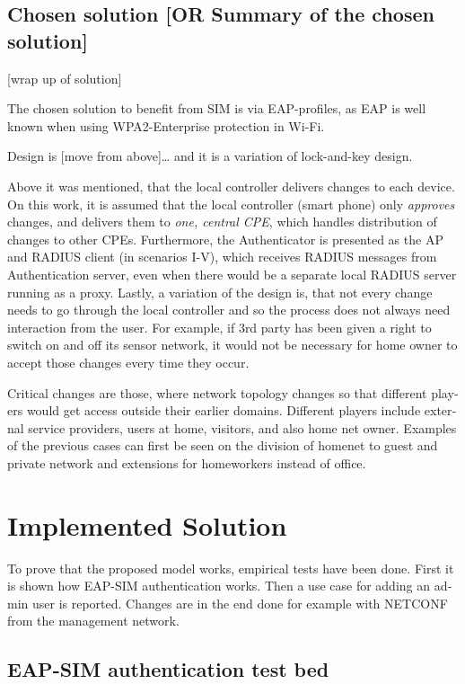 \documentclass[12pt,a4paper,english]{tutthesis}
\begin{document}
\begin{otherlanguage}{english}
\section{Chosen solution [OR Summary of the chosen solution]}
\label{sec-4-9}

[wrap up of solution]

The chosen solution to benefit from SIM is via EAP-profiles, as EAP
is well known when using WPA2-Enterprise protection in Wi-Fi.

Design is [move from above]\ldots{}
and it is a variation of lock-and-key design.

Above it was mentioned, that the local controller delivers changes to each
device. On this work, it is assumed that the local controller (smart
phone) only \emph{approves} changes,
and delivers them to \emph{one, central CPE}, 
which handles distribution of changes to other CPEs.
Furthermore, the Authenticator is presented as the AP and
RADIUS client (in scenarios I-V), which receives RADIUS messages from
Authentication server, even when there would be a separate local RADIUS server
running as a proxy.
Lastly, a variation of the design is, that not every change needs to go
 through  the local controller and so the process does not always need
interaction from the user. For example, if 3rd party has been given 
a right to switch on and off its sensor network, it would not be 
necessary for home owner to accept those changes every time they occur.



Critical changes are those, where network topology changes so
that different players would get access outside their earlier domains.
Different players include external service providers, users at home,
visitors, and also home net owner. Examples of the previous cases can first be
seen on the division of homenet to guest and private network and
extensions for homeworkers instead of office.


\chapter{Implemented Solution}
\label{sec-5}


To prove that the proposed model works, empirical tests have been done.
First it is shown how EAP-SIM authentication works. Then a use case for
adding an admin user is reported. Changes are in the end done 
for example with NETCONF from the management network.

\section{EAP-SIM authentication test bed}
\label{sec-5-1}




\end{otherlanguage}
\end{document}
